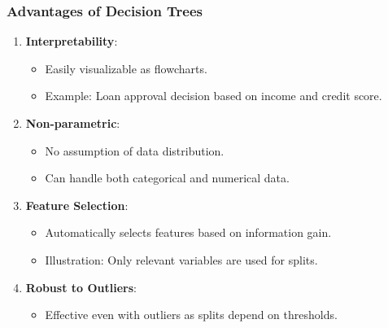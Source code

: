 \documentclass[aspectratio=169]{beamer}
\begin{document}
\begin{frame}[fragile]
    \frametitle{Advantages of Decision Trees}
    \begin{enumerate}
        \item \textbf{Interpretability}:
            \begin{itemize}
                \item Easily visualizable as flowcharts.
                \item Example: Loan approval decision based on income and credit score.
            \end{itemize}
        
        \item \textbf{Non-parametric}:
            \begin{itemize}
                \item No assumption of data distribution.
                \item Can handle both categorical and numerical data.
            \end{itemize}
        
        \item \textbf{Feature Selection}:
            \begin{itemize}
                \item Automatically selects features based on information gain.
                \item Illustration: Only relevant variables are used for splits.
            \end{itemize}

        \item \textbf{Robust to Outliers}:
            \begin{itemize}
                \item Effective even with outliers as splits depend on thresholds.
            \end{itemize}
    \end{enumerate}
\end{frame}
\end{document}
